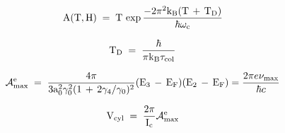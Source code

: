 {\newpage
\clearpage
\samepage \begin{figure}\center
{} 

\label{mr}
\end{figure}
}

{\newpage
\clearpage
\samepage \begin{equation}\label{amplit}
\rm A(T, H) \; = \; T \, \exp \frac{- 2 \pi^2 k_B (T \, + \, T_D)}{\hbar \omega_c}
\end{equation}
}

{\newpage
\clearpage
\samepage \begin{displaymath}\rm T_D \; = \; \frac{\hbar}{\pi k_B \tau_{col}}
\end{displaymath}
}

{\newpage
\clearpage
\samepage \begin{figure}\center
{} 

\label{sdh:calc}
\end{figure}
}

{\newpage
\clearpage
\samepage \begin{equation}\label{sdh:E_F}
\rm {\cal A}_{max}^e \; = \; \frac{4 \pi}{3a_0^2 \gamma_0^2 (1 \, + \, 2\gamma_4/\gamma_0)^2}(E_3 \, - \, E_F)(E_2 \, - \, E_F)\\ 
= \frac{2\pi {\mit e}\nu_{max}}{\hbar {\mit c}}
\end{equation}
}

{\newpage
\clearpage
\samepage \begin{displaymath}\rm V_{cyl} \; = \; \frac{2 \pi}{I_c} {\cal A}_{max}^e
\end{displaymath}
}

{\newpage
\clearpage
\samepage \begin{figure}\center
{} 

\label{csbistruct}
\end{figure}
}

